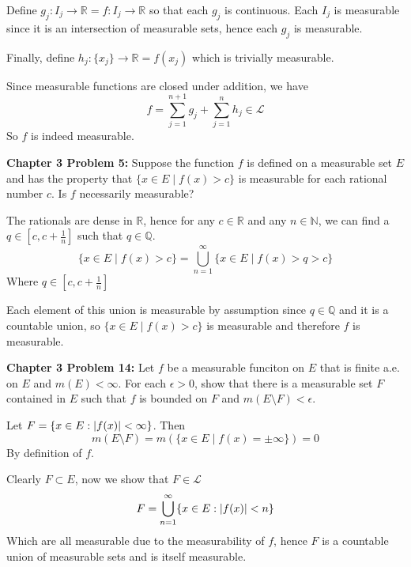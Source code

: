 \documentclass[11pt]{article}
\DeclarePairedDelimiter{\card}{\lvert}{\rvert}
\newcommand{\R}{\mathbb{R}}
\newcommand{\N}{\mathbb{N}}
\newcommand{\Q}{\mathbb{Q}}
\begin{document}
    Define $g_j: I_j \rightarrow \R = f: I_j \rightarrow \R$ so that each $g_j$ is continuous.
    Each $I_j$ is measurable since it is an intersection of measurable sets, hence each $g_j$ is measurable.

    Finally, define $h_j: \{ x_j \} \rightarrow \R = f(x_j)$ which is trivially measurable.

    Since measurable functions are closed under addition, we have
    \[
        f = \sum_{j=1}^{n+1} g_j + \sum_{j=1}^{n} h_j \in \mathcal{L}
    \]
    So $f$ is indeed measurable.

    \clearpage

    \begin{mybox}
        \textbf{Chapter 3 Problem 5:} Suppose the function $f$ is defined on a measurable set $E$ and has the property that $\{ x \in E \mid f(x) > c \}$ is measurable for each rational number $c$.
        Is $f$ necessarily measurable?
    \end{mybox}

    The rationals are dense in $\R$, hence for any $c \in \R$ and any $n \in \N$, we can find a $q \in \left[c, c + \frac{1}{n}\right]$ such that $q \in \Q$.
    \[
        \{ x \in E \mid f(x) > c \} = \bigcup_{n=1}^{\infty} \{ x \in E \mid f(x) > q > c \}
    \]
    Where $q \in \left[c, c + \frac{1}{n}\right]$

    Each element of this union is measurable by assumption since $q \in \Q$ and it is a countable union, so $\{ x \in E \mid f(x) > c \}$ is measurable and therefore $f$ is measurable.

    \clearpage

    \begin{mybox}
        \textbf{Chapter 3 Problem 14:} Let $f$ be a measurable funciton on $E$ that is finite a.e. on $E$ and $m(E) < \infty$.
        For each $\epsilon > 0$, show that there is a measurable set $F$ contained in $E$ such that $f$ is bounded on $F$ and $m(E \setminus F) < \epsilon$.
    \end{mybox}

    Let $F = \{ x \in E : \card{f(x)} < \infty \}$.
    Then
    \[
        m(E \setminus F) = m(\{ x \in E \mid f(x) = \pm \infty \}) = 0
    \]
    By definition of $f$.

    Clearly $F \subset E$, now we show that $F \in \mathcal{L}$
    \[
        F = \bigcup_{n=1}^{\infty} \{ x \in E : \card{f(x)} < n \}
    \]
    Which are all measurable due to the measurability of $f$, hence $F$ is a countable union of measurable sets and is itself measurable.
\end{document}
